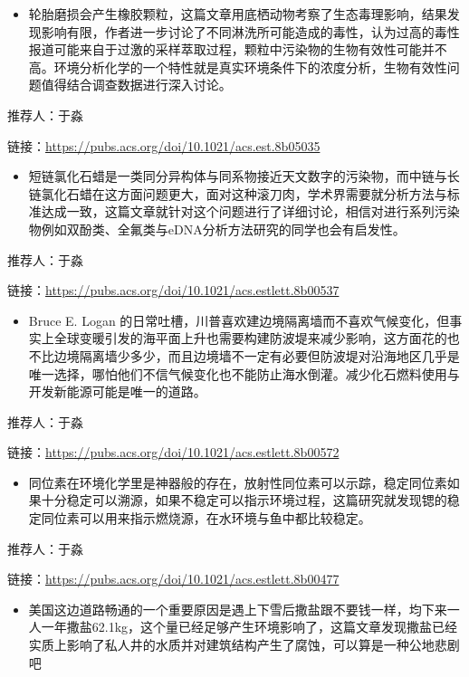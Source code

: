 \documentclass[]{book}
\providecommand{\tightlist}{%
  \setlength{\itemsep}{0pt}\setlength{\parskip}{0pt}}
\begin{document}
\begin{itemize}
\tightlist
\item
  轮胎磨损会产生橡胶颗粒，这篇文章用底栖动物考察了生态毒理影响，结果发现影响有限，作者进一步讨论了不同淋洗所可能造成的毒性，认为过高的毒性报道可能来自于过激的采样萃取过程，颗粒中污染物的生物有效性可能并不高。环境分析化学的一个特性就是真实环境条件下的浓度分析，生物有效性问题值得结合调查数据进行深入讨论。
\end{itemize}

推荐人：于淼

链接：\url{https://pubs.acs.org/doi/10.1021/acs.est.8b05035}

\begin{itemize}
\tightlist
\item
  短链氯化石蜡是一类同分异构体与同系物接近天文数字的污染物，而中链与长链氯化石蜡在这方面问题更大，面对这种滚刀肉，学术界需要就分析方法与标准达成一致，这篇文章就针对这个问题进行了详细讨论，相信对进行系列污染物例如双酚类、全氟类与eDNA分析方法研究的同学也会有启发性。
\end{itemize}

推荐人：于淼

链接：\url{https://pubs.acs.org/doi/10.1021/acs.estlett.8b00537}

\begin{itemize}
\tightlist
\item
  Bruce E. Logan 的日常吐槽，川普喜欢建边境隔离墙而不喜欢气候变化，但事实上全球变暖引发的海平面上升也需要构建防波堤来减少影响，这方面花的也不比边境隔离墙少多少，而且边境墙不一定有必要但防波堤对沿海地区几乎是唯一选择，哪怕他们不信气候变化也不能防止海水倒灌。减少化石燃料使用与开发新能源可能是唯一的道路。
\end{itemize}

推荐人：于淼

链接：\url{https://pubs.acs.org/doi/10.1021/acs.estlett.8b00572}

\begin{itemize}
\tightlist
\item
  同位素在环境化学里是神器般的存在，放射性同位素可以示踪，稳定同位素如果十分稳定可以溯源，如果不稳定可以指示环境过程，这篇研究就发现锶的稳定同位素可以用来指示燃烧源，在水环境与鱼中都比较稳定。
\end{itemize}

推荐人：于淼

链接：\url{https://pubs.acs.org/doi/10.1021/acs.estlett.8b00477}

\begin{itemize}
\tightlist
\item
  美国这边道路畅通的一个重要原因是遇上下雪后撒盐跟不要钱一样，均下来一人一年撒盐62.1kg，这个量已经足够产生环境影响了，这篇文章发现撒盐已经实质上影响了私人井的水质并对建筑结构产生了腐蚀，可以算是一种公地悲剧吧
\end{itemize}
\end{document}
